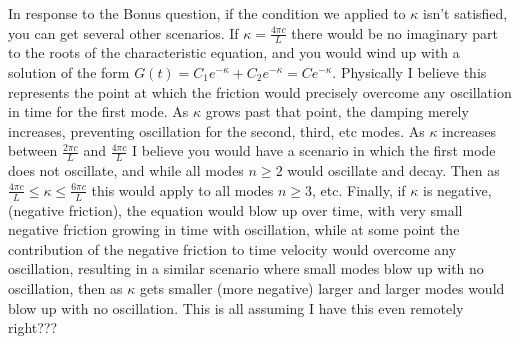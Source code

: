 \documentclass{article}
\begin{document}
In response to the Bonus question, if the condition we applied to $\kappa$ isn't satisfied, you can get several other scenarios. If $\kappa = \frac{4\pi c}{L}$ there would be no imaginary part to the roots of the characteristic equation, and you would wind up with a solution of the form $G(t) = C_1e^{-\kappa} + C_2e^{-\kappa} = Ce^{-\kappa}$. Physically I believe this represents the point at which the friction would precisely overcome any oscillation in time for the first mode. As $\kappa$ grows past that point, the damping merely increases, preventing oscillation for the second, third, etc modes. As $\kappa$ increases between $\frac{2\pi c}{L}$ and  $\frac{4\pi c}{L}$ I believe you would have a scenario in which the first mode does not oscillate, and while all modes $n \geq 2$ would oscillate and decay. Then as $\frac{4\pi c}{L} \leq \kappa \leq \frac{6\pi c}{L}$ this would apply to all modes $n \geq 3$, etc. Finally, if $\kappa$ is negative, (negative friction), the equation would blow up over time, with very small negative friction growing in time with oscillation, while at some point the contribution of the negative friction to time velocity would overcome any oscillation, resulting in a similar scenario where small modes blow up with no oscillation, then as $\kappa$ gets smaller (more negative) larger and larger modes would blow up with no oscillation. This is all assuming I have this even remotely right???
\end{document}
